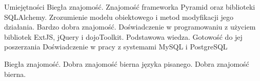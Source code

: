 \begin{rubric}{Umiejętności}
\entry*[Python]
	Biegła znajomość. Znajomość frameworka Pyramid oraz biblioteki SQLAlchemy.
    Zrozumienie modelu obiektowego i metod modyfikacji jego działania.
\entry*[JavaScript]
	Bardzo dobra znajomość. Doświadczenie w programowaniu z użyciem
	bibliotek ExtJS, jQuery i dojoToolkit.
	Podstawowa wiedza. Gotowość do jej poszerzania
	Doświadczenie w pracy z systemami MySQL i PostgreSQL

\entry*[Angielski]
	Biegła znajomość.
\entry*[Rosyjski]
	Dobra znajomość bierna języka pisanego.
\entry*[Cerkiewnosłowiański]
	Dobra znajomość bierna.
\end{rubric}
